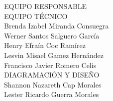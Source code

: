 {\Bold \LARGE EQUIPO RESPONSABLE}\\[2cm]
{\Bold \large \color{color1!89!black} EQUIPO TÉCNICO}\\[0.2cm]
Brenda Izabel Miranda Consuegra\\
Werner Santos Salguero García\\
Henry Efraín Coc Ramírez\\
Lesvin Misael Gamez Hernández\\
Francisco Javier Romero Celis\\[0.8cm]
{\Bold \large \color{color1!89!black} DIAGRAMACIÓN Y DISEÑO}\\[0.2cm]
Shannon Nazareth Cap Morales\\
Lester Ricardo Guerra Morales
